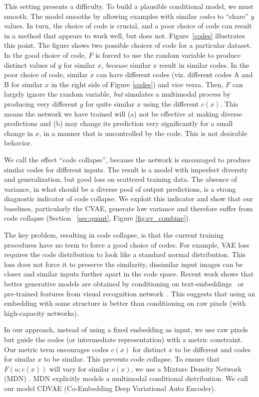 \documentclass[10pt,twocolumn,letterpaper]{article}
\begin{document}
This setting presents a difficulty.  To build a plausible conditional model, we must smooth.
The model smooths by allowing examples with similar {\em codes} to ``share'' $y$ values.  In turn, the choice of code
is crucial, and a poor choice of code can result in a method that appears to work well, but does not.  
Figure~\ref{codes} illustrates this point.   The figure shows two possible choices of code for a particular dataset.  
In the good choice of code, $F$ is forced to use the random variable to produce distinct values of $y$ for similar $x$,
{\em because} similar $x$ result in similar codes.  
In the poor choice of code, similar $x$ can have different codes 
(viz. different codes A and B for similar $x$ in the right side of Figure \ref{codes}) and vice versa.  
Then, $F$ can largely ignore the random variable, {\em but} simulates a multimodal process 
by producing very different $y$ for quite similar $x$ using the different $c(x)$.
This means the network we have trained will (a) not be effective at making diverse predictions and (b) may change 
its prediction very significantly for a small change in $x$, in a manner that is uncontrolled by the code.  This is not 
desirable behavior.  

We call the effect ``code collapse'', because the network is
encouraged to produce similar codes for different inputs.  The result is a model with imperfect diversity 
and generalization, but good loss on scattered training data. The absence of variance, in what should be
a diverse pool of output predictions, is a strong diagnostic indicator of code collapse. We exploit 
this indicator and show that our baselines, particularly the CVAE, generate low variance and therefore 
suffer from code collapse (Section ~\ref{sec:quant}, Figure \ref{fig:ev_combine}).


The key problem, resulting in code collapse, is that the current training procedures have no term to force a good choice of 
codes. For example, VAE loss requires the code distribution to look like a standard normal 
distribution. This loss does not force it to preserve the similarity, dissimilar input 
images can be closer and similar inputs further apart in the code space. Recent work shows that better generative models 
are obtained by conditioning on text-embeddings~\cite{Scott16} or pre-trained features from visual 
recognition network~\cite{NguyenYBDC16}. This suggests that using an embedding with some structure
is better than conditioning on raw pixels (with high-capacity networks).  

In our approach, instead of using a fixed embedding as input, we use raw pixels but guide 
the codes (or intermediate representation) with a metric constraint. Our metric term encourages codes $c(x)$ for 
distinct $x$ to be different and codes for similar $x$ to be similar. This prevents code 
collapse. To ensure that $F(u; c(x))$ will vary for similar $c(x)$, we use a Mixture Density 
Network (MDN) \cite{bishop1994mixture}. MDN explicitly models a multimodal conditional 
distribution. We call our model CDVAE (Co-Embedding Deep Variational Auto Encoder).
\end{document}

